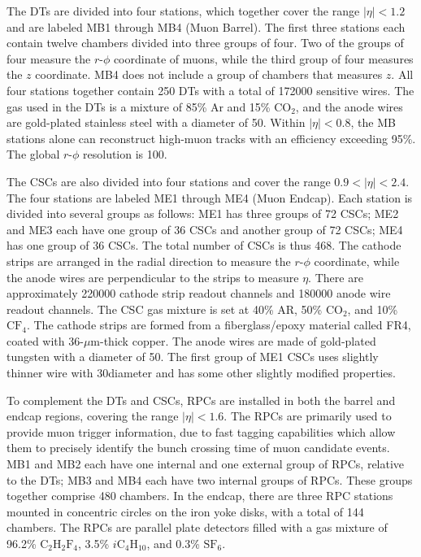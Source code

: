 The DTs are divided into four stations, which together cover the range $|\eta|<1.2$ and are labeled MB1 through MB4 (Muon Barrel). The first three stations each contain twelve chambers divided into three groups of four. Two of the groups of four measure the $r$-$\phi$ coordinate of muons, while the third group of four measures the $z$ coordinate. MB4 does not include a group of chambers that measures $z$. All four stations together contain 250 DTs with a total of 172000 sensitive wires. The gas used in the DTs is a mixture of 85\% Ar and 15\% $\text{CO}_2$, and the anode wires are gold-plated stainless steel with a diameter of 50\mum. Within $|\eta|<0.8$, the MB stations alone can reconstruct high-\pt muon tracks with an efficiency exceeding 95\%. The global $r$-$\phi$ resolution is 100\mum.

The CSCs are also divided into four stations and cover the range $0.9<|\eta|<2.4$. The four stations are labeled ME1 through ME4 (Muon Endcap). Each station is divided into several groups as follows: ME1 has three groups of 72 CSCs; ME2 and ME3 each have one group of 36 CSCs and another group of 72 CSCs; ME4 has one group of 36 CSCs. The total number of CSCs is thus 468. The cathode strips are arranged in the radial direction to measure the $r$-$\phi$ coordinate, while the anode wires are perpendicular to the strips to measure $\eta$. There are approximately 220000 cathode strip readout channels and 180000 anode wire readout channels. The CSC gas mixture is set at 40\% AR, 50\% $\text{CO}_2$, and 10\% $\text{CF}_4$. The cathode strips are formed from a fiberglass/epoxy material called FR4, coated with 36-$\mu$m-thick copper. The anode wires are made of gold-plated tungsten with a diameter of 50\mum. The first group of ME1 CSCs uses slightly thinner wire with 30\mum diameter and has some other slightly modified properties.

To complement the DTs and CSCs, RPCs are installed in both the barrel and endcap regions, covering the range $|\eta|<1.6$. The RPCs are primarily used to provide muon trigger information, due to fast tagging capabilities which allow them to precisely identify the bunch crossing time of muon candidate events. MB1 and MB2 each have one internal and one external group of RPCs, relative to the DTs; MB3 and MB4 each have two internal groups of RPCs. These groups together comprise 480 chambers. In the endcap, there are three RPC stations mounted in concentric circles on the iron yoke disks, with a total of 144 chambers. The RPCs are parallel plate detectors filled with a gas mixture of 96.2\% $\text{C}_2\text{H}_2\text{F}_4$, 3.5\% $i\text{C}_4\text{H}_{10}$, and 0.3\% $\text{SF}_6$.

